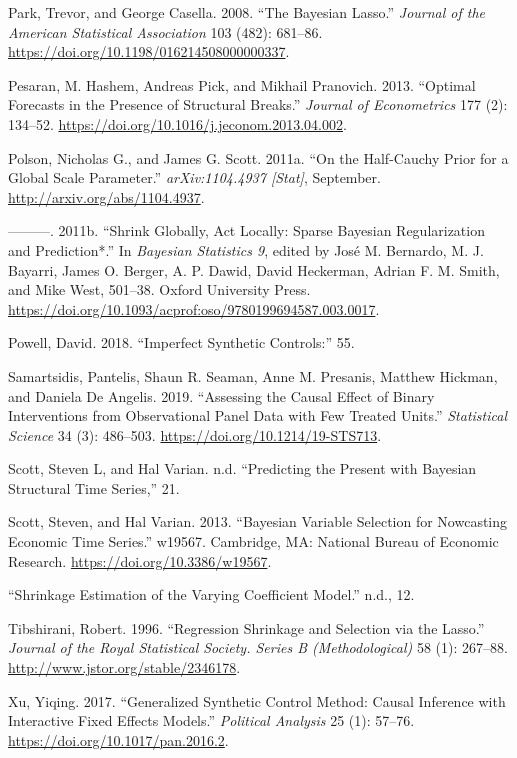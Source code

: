 \documentclass[
]{article}
\begin{document}
\leavevmode\hypertarget{ref-park_bayesian_2008}{}%
Park, Trevor, and George Casella. 2008. ``The Bayesian Lasso.''
\emph{Journal of the American Statistical Association} 103 (482):
681--86. \url{https://doi.org/10.1198/016214508000000337}.

\leavevmode\hypertarget{ref-pesaran_optimal_2013}{}%
Pesaran, M. Hashem, Andreas Pick, and Mikhail Pranovich. 2013. ``Optimal
Forecasts in the Presence of Structural Breaks.'' \emph{Journal of
Econometrics} 177 (2): 134--52.
\url{https://doi.org/10.1016/j.jeconom.2013.04.002}.

\leavevmode\hypertarget{ref-polson_half-cauchy_2011}{}%
Polson, Nicholas G., and James G. Scott. 2011a. ``On the Half-Cauchy
Prior for a Global Scale Parameter.'' \emph{arXiv:1104.4937 {[}Stat{]}},
September. \url{http://arxiv.org/abs/1104.4937}.

\leavevmode\hypertarget{ref-bernardo_shrink_2011}{}%
---------. 2011b. ``Shrink Globally, Act Locally: Sparse Bayesian
Regularization and Prediction*.'' In \emph{Bayesian Statistics 9},
edited by José M. Bernardo, M. J. Bayarri, James O. Berger, A. P. Dawid,
David Heckerman, Adrian F. M. Smith, and Mike West, 501--38. Oxford
University Press.
\url{https://doi.org/10.1093/acprof:oso/9780199694587.003.0017}.

\leavevmode\hypertarget{ref-powell_imperfect_2018}{}%
Powell, David. 2018. ``Imperfect Synthetic Controls:'' 55.

\leavevmode\hypertarget{ref-samartsidis_assessing_2019}{}%
Samartsidis, Pantelis, Shaun R. Seaman, Anne M. Presanis, Matthew
Hickman, and Daniela De Angelis. 2019. ``Assessing the Causal Effect of
Binary Interventions from Observational Panel Data with Few Treated
Units.'' \emph{Statistical Science} 34 (3): 486--503.
\url{https://doi.org/10.1214/19-STS713}.

\leavevmode\hypertarget{ref-scott_predicting_nodate}{}%
Scott, Steven L, and Hal Varian. n.d. ``Predicting the Present with
Bayesian Structural Time Series,'' 21.

\leavevmode\hypertarget{ref-scott_bayesian_2013}{}%
Scott, Steven, and Hal Varian. 2013. ``Bayesian Variable Selection for
Nowcasting Economic Time Series.'' w19567. Cambridge, MA: National
Bureau of Economic Research. \url{https://doi.org/10.3386/w19567}.

\leavevmode\hypertarget{ref-noauthor_shrinkage_nodate}{}%
``Shrinkage Estimation of the Varying Coefficient Model.'' n.d., 12.

\leavevmode\hypertarget{ref-tibshirani_regression_1996}{}%
Tibshirani, Robert. 1996. ``Regression Shrinkage and Selection via the
Lasso.'' \emph{Journal of the Royal Statistical Society. Series B
(Methodological)} 58 (1): 267--88.
\url{http://www.jstor.org/stable/2346178}.

\leavevmode\hypertarget{ref-xu_generalized_2017}{}%
Xu, Yiqing. 2017. ``Generalized Synthetic Control Method: Causal
Inference with Interactive Fixed Effects Models.'' \emph{Political
Analysis} 25 (1): 57--76. \url{https://doi.org/10.1017/pan.2016.2}.
\end{document}
